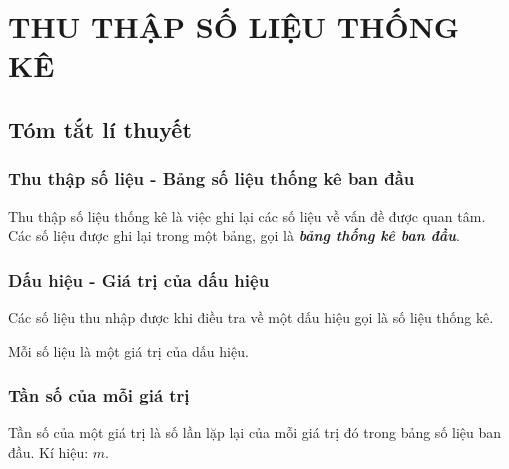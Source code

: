 \section{THU THẬP SỐ LIỆU THỐNG KÊ}
\subsection{Tóm tắt lí thuyết}
\subsubsection{Thu thập số liệu - Bảng số liệu thống kê ban đầu}
\begin{dn}
	Thu thập số liệu thống kê là việc ghi lại các số liệu về vấn đề được quan tâm. Các số liệu được ghi lại trong một bảng, gọi là \textbf{\textit{bảng thống kê ban đầu}}.
\end{dn}
\subsubsection{Dấu hiệu - Giá trị của dấu hiệu}
\begin{dn}
	\begin{enumEX}[a.]{1}
		\item	Các số liệu thu nhập được khi điều tra về một dấu hiệu gọi là số liệu thống kê.
		\item 	Mỗi số liệu là một giá trị của dấu hiệu.
	\end{enumEX}
\end{dn}
\subsubsection{Tần số của mỗi giá trị}
\begin{dn}
	Tần số của một giá trị là số lần lặp lại của mỗi giá trị đó trong bảng số liệu ban đầu. Kí hiệu: $m$.
\end{dn}
